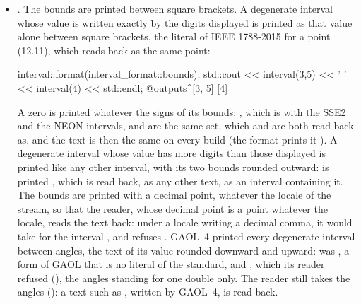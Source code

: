 \begin{itemize}
\item[$\bullet$] . The bounds are printed between square
brackets. A degenerate interval whose value is written exactly by the
digits displayed is printed as that value alone between square brackets,
the literal of IEEE 1788-2015 for a point (12.11), which
 reads back as the same point:
\begin{example}
interval::format(interval_format::bounds);
std::cout << interval(3,5) << ' ' << interval(4) << std::endl;
@outputs^[3, 5] [4]~
\end{example}
A zero is printed \code{[0]} whatever the signs of its bounds:
, which  is with the SSE2 and the NEON
intervals,  and  are the same set, which \code{[0]}
and \code{[-0]} are both read back as, and the text is then the same on
every build (the format  prints it \code{[0x0p+0]}). A
degenerate interval whose value has more digits than those displayed is
printed like any other interval, with its two bounds rounded outward:
 is printed \code{[0.1, 0.1000000000000001]}, which is
read back, as any other text, as an interval containing it. The bounds are
printed with a decimal point, whatever the locale of the stream, so that
the reader, whose decimal point is a point whatever the locale, reads the
text back: under a locale writing a decimal comma, it would take
\code{[-2,5]} for the interval , and refuses
\code{[0,5, 2,5]}.\newinvfive{} GAOL~4 printed every degenerate interval
between angles, the text of its value rounded downward and upward:
 was , a form of GAOL that is no literal of
the standard, and  ,
which its reader refused (), the angles
standing for one double only. The reader still takes the angles
(): a text such as , written by
GAOL~4, is read back.


\end{itemize}
